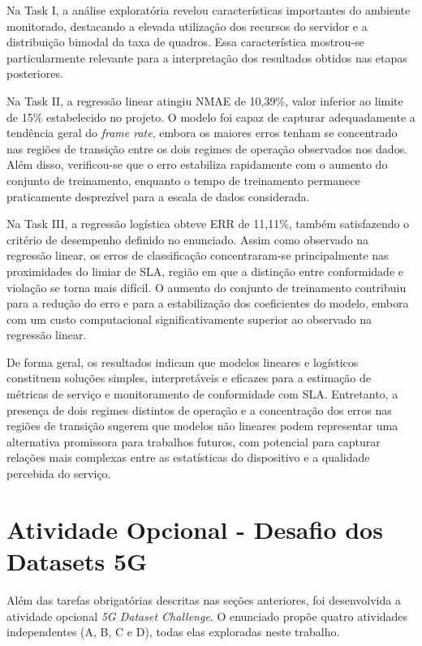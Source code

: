 \documentclass[11pt,a4paper]{article}
\begin{document}
Na Task I, a análise exploratória revelou características importantes do ambiente monitorado, destacando a elevada utilização dos recursos do servidor e a distribuição bimodal da taxa de quadros. Essa característica mostrou-se particularmente relevante para a interpretação dos resultados obtidos nas etapas posteriores.

Na Task II, a regressão linear atingiu NMAE de 10{,}39\%, valor inferior ao limite de 15\% estabelecido no projeto. O modelo foi capaz de capturar adequadamente a tendência geral do \emph{frame rate}, embora os maiores erros tenham se concentrado nas regiões de transição entre os dois regimes de operação observados nos dados. Além disso, verificou-se que o erro estabiliza rapidamente com o aumento do conjunto de treinamento, enquanto o tempo de treinamento permanece praticamente desprezível para a escala de dados considerada.

Na Task III, a regressão logística obteve ERR de 11{,}11\%, também satisfazendo o critério de desempenho definido no enunciado. Assim como observado na regressão linear, os erros de classificação concentraram-se principalmente nas proximidades do limiar de SLA, região em que a distinção entre conformidade e violação se torna mais difícil. O aumento do conjunto de treinamento contribuiu para a redução do erro e para a estabilização dos coeficientes do modelo, embora com um custo computacional significativamente superior ao observado na regressão linear.

De forma geral, os resultados indicam que modelos lineares e logísticos constituem soluções simples, interpretáveis e eficazes para a estimação de métricas de serviço e monitoramento de conformidade com SLA. Entretanto, a presença de dois regimes distintos de operação e a concentração dos erros nas regiões de transição sugerem que modelos não lineares podem representar uma alternativa promissora para trabalhos futuros, com potencial para capturar relações mais complexas entre as estatísticas do dispositivo e a qualidade percebida do serviço.


\section{Atividade Opcional - Desafio dos Datasets 5G}
\label{sec:opcional}

Além das tarefas obrigatórias descritas nas seções anteriores, foi desenvolvida a atividade opcional \emph{5G Dataset Challenge}. O enunciado propõe quatro atividades independentes (A, B, C e D), todas elas exploradas neste trabalho.
\end{document}
